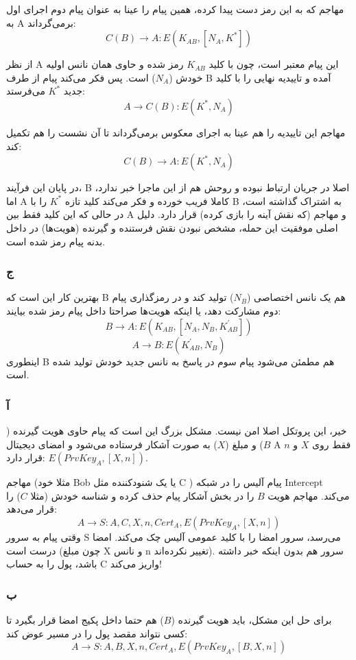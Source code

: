  مهاجم که به این رمز دست پیدا کرده، همین پیام را عینا به عنوان پیام دوم اجرای اول به A برمی‌گرداند:
    $$ C(B) \rightarrow A: E(K_{AB}, [N_A, K^*])$$
    
 از نظر A این پیام معتبر است، چون با کلید $K_{AB}$ رمز شده و حاوی همان نانس اولیه خودش ($N_A$) است. پس فکر می‌کند پیام از طرف B آمده و تاییدیه نهایی را با کلید جدید $K^*$ می‌فرستد:
    $$ A \rightarrow C(B): E(K^*, N_A)$$
    
 مهاجم این تاییدیه را هم عینا به اجرای معکوس برمی‌گرداند تا آن نشست را هم تکمیل کند:
    $$ C(B) \rightarrow A: E(K^*, N_A)$$

 در پایان این فرآیند، B اصلا در جریان ارتباط نبوده و روحش هم از این ماجرا خبر ندارد، اما A کاملا فریب خورده و فکر می‌کند کلید تازه $K^*$ را با B به اشتراک گذاشته است، در حالی که این کلید فقط بین A و مهاجم (که نقش آینه را بازی کرده) قرار دارد. دلیل اصلی موفقیت این حمله، مشخص نبودن نقش فرستنده و گیرنده (هویت‌ها) در داخل بدنه پیام رمز شده است.

\subsubsection*{ج}
بهترین کار این است که B هم یک نانس اختصاصی ($N_B$) تولید کند و در رمزگذاری پیام دوم مشارکت دهد، یا اینکه هویت‌ها صراحتا داخل پیام رمز شده بیایند:
$$ B\rightarrow A: E(K_{AB}, [N_{A}, N_B, K_{AB}^{\prime}])$$
$$ A\rightarrow B: E(K_{AB}^{\prime}, N_{B})$$
اینطوری B هم مطمئن می‌شود پیام سوم در پاسخ به نانس جدید خودش تولید شده است.




\subsubsection*{آ}
خیر، این پروتکل {اصلا امن نیست}. مشکل بزرگ این است که پیام حاوی هویت گیرنده ($B$) و مبلغ ($X$) به صورت آشکار فرستاده می‌شود و امضای دیجیتال A فقط روی $X$ و $n$ قرار دارد: $E(PrvKey_{A},[X,n])$.

مهاجم (مثلا خود Bob یا یک شنودکننده مثل C ) پیام آلیس را در شبکه Intercept می‌کند. مهاجم هویت $B$ را در بخش آشکار پیام حذف کرده و شناسه خودش (مثلا $C$) را قرار می‌دهد:
$$A\rightarrow S: A, C, X, n, Cert_{A}, E(PrvKey_{A},[X,n])$$
وقتی پیام به سرور S می‌رسد، سرور امضا را با کلید عمومی آلیس چک می‌کند. امضا درست است (چون مبلغ X و نانس n تغییر نکرده‌اند). سرور هم بدون اینکه خبر داشته باشد، پول را به حساب C واریز می‌کند!

\medskip
\subsubsection*{ب}
برای حل این مشکل، باید هویت گیرنده ($B$) هم حتما داخل پکیج امضا قرار بگیرد تا کسی نتواند مقصد پول را در مسیر عوض کند:
$$A\rightarrow S: A, B, X, n, Cert_{A}, E(PrvKey_{A}, [B, X, n])$$



